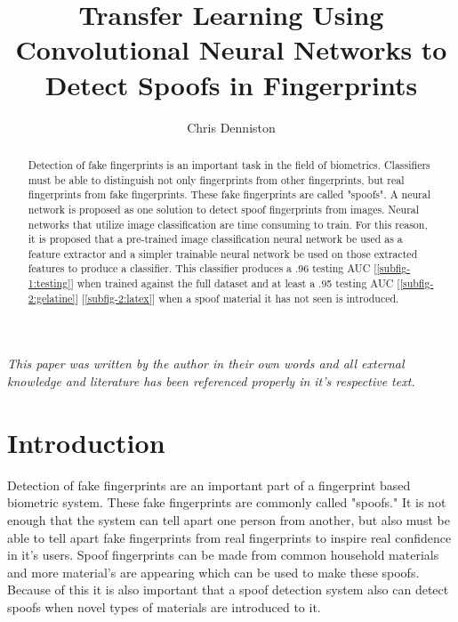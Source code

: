 \documentclass[]{article}
\title{Transfer Learning Using Convolutional Neural Networks to Detect Spoofs in Fingerprints}
\author{Chris Denniston}
\begin{document}
\maketitle
\textit{This paper was written by the author in their own words and all external knowledge and literature has been referenced properly in it's respective text.}
\begin{abstract}
Detection of fake fingerprints is an important task in the field of biometrics. Classifiers must be able to distinguish not only fingerprints from other fingerprints, but real fingerprints from fake fingerprints. These fake fingerprints are called "spoofs". A neural network is proposed as one solution to detect spoof fingerprints from images. Neural networks that utilize image classification are time consuming to train. For this reason, it is proposed that a pre-trained image classification neural network be used as a feature extractor and a simpler trainable neural network be used on those extracted features to produce a classifier. This classifier produces a .96 testing AUC [\ref{subfig-1:testing}] when trained against the full dataset and at least a .95 testing AUC [\ref{subfig-2:gelatine}] [\ref{subfig-2:latex}] when a spoof material it has not seen is introduced.
\end{abstract}

\section{Introduction}
Detection of fake fingerprints are an important part of a fingerprint based biometric system. These fake fingerprints are commonly called "spoofs." It is not enough that the system can tell apart one person from another, but also must be able to tell apart fake fingerprints from real fingerprints to inspire real confidence in it's users. Spoof fingerprints can be made from common household materials and more material's are appearing which can be used to make these spoofs. Because of this it is also important that a spoof detection system also can detect spoofs when novel types of materials are introduced to it. 
\end{document}
